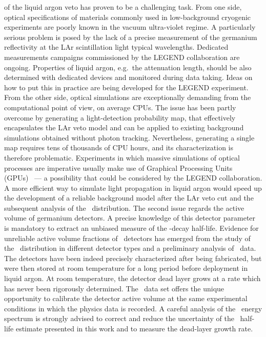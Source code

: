 of the liquid argon veto has proven to be a challenging task. From one side, optical
specifications of materials commonly used in low-background cryogenic experiments are
poorly known in the vacuum ultra-violet regime. A particularly serious problem is posed by
the lack of a precise measurement of the germanium reflectivity at the LAr scintillation
light typical wavelengths. Dedicated measurements campaigns commissioned by the LEGEND
collaboration are ongoing.  Properties of liquid argon, e.g.~the attenuation length,
should be also determined with dedicated devices and monitored during data taking. Ideas
on how to put this in practice are being developed for the LEGEND experiment. From the
other side, optical simulations are exceptionally demanding from the computational point
of view, on average CPUs. The issue has been partly overcome by generating a
light-detection probability map, that effectively encapsulates the LAr veto model and can
be applied to existing background simulations obtained without photon tracking.
Nevertheless, generating a single map requires tens of thousands of CPU hours, and its
characterization is therefore problematic. Experiments in which massive simulations of
optical processes are imperative usually make use of Graphical Processing Units
(GPUs)~\cite{Merck2012, Blyth2019} --- a possibility that could be considered by the
LEGEND collaboration. A more efficient way to simulate light propagation in liquid argon
would speed up the development of a reliable background model after the LAr veto cut and
the subsequent analysis of the \nnbb\ distribution.
\newpar
The second issue regards the active volume of germanium detectors. A precise knowledge of
this detector parameter is mandatory to extract an unbiased measure of the \nnbb-decay
half-life. Evidence for unreliable active volume fractions of \bege\ detectors has emerged
from the study of the \nnbb\ distribution in different detector types and a preliminary
analysis of \Arl\ data.  The detectors have been indeed precisely characterized after
being fabricated, but were then stored at room temperature for a long period before
deployment in liquid argon. At room temperature, the detector dead layer grows at a rate
which has never been rigorously determined. The \Arl\ data set offers the unique
opportunity to calibrate the detector active volume at the same experimental conditions in
which the physics data is recorded. A careful analysis of the \Arl\ energy spectrum is
strongly advised to correct and reduce the uncertainty of the \nnbb\ half-life estimate
presented in this work and to measure the dead-layer growth rate.
